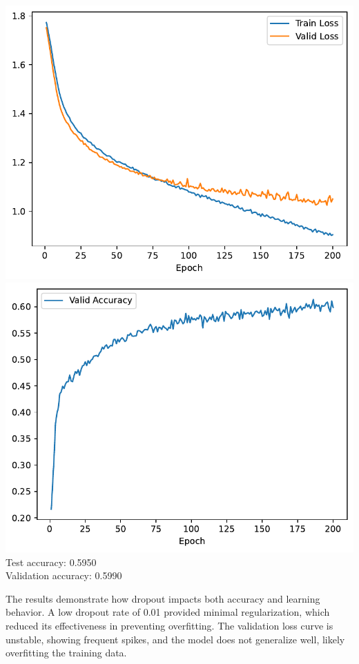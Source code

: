 \documentclass[12pt,a4paper]{article}
\begin{document}
\begin{itemize}
                \includegraphics[width=\imagewidth]{q2/q2_2b_dropout_0.5-training-loss.pdf}
                \includegraphics[width=\imagewidth]{q2/q2_2b_dropout_0.5-validation-accuracy.pdf} \\
                Test accuracy: 0.5950 \\
                Validation accuracy: 0.5990
        \end{itemize}
        The results demonstrate how dropout impacts both accuracy and learning behavior. A low dropout rate of 0.01 provided minimal regularization, which reduced its effectiveness in preventing overfitting. The validation loss curve is unstable, showing frequent spikes, and the model does not generalize well, likely overfitting the training data. \\
\end{document}
